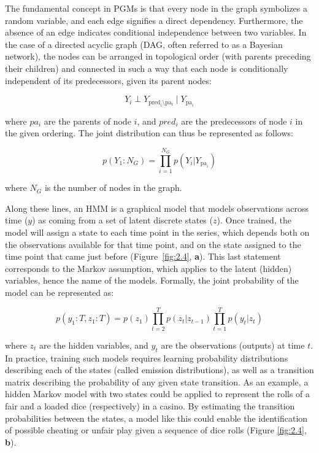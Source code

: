 The fundamental concept in PGMs is that every node in the graph symbolizes a random variable, and each edge signifies a direct dependency. Furthermore, the absence of an edge indicates conditional independence between two variables. In the case of a directed acyclic graph (DAG, often referred to as a Bayesian network), the nodes can be arranged in topological order (with parents preceding their children) and connected in such a way that each node is conditionally independent of its predecessors, given its parent nodes:

\begin{equation}
Y_i \perp Y_{\mathrm{pred}_i \setminus \mathrm{pa_i}} \mid Y_{\mathrm{pa}_i}
\label{eq:2.4}
\end{equation}

\noindent where $pa_i$ are the parents of node $i$, and $pred_i$ are the predecessors of node $i$ in the given ordering. The joint distribution can thus be represented as follows:

\begin{equation}
p(Y_1:N_G) = \prod_{i=1}^{N_G} p(Y_i | Y_{\mathrm{pa}_i})
\label{eq:2.5}
\end{equation}

\noindent where $N_G$ is the number of nodes in the graph.

Along these lines, an HMM is a graphical model that models observations across time ($y$) as coming from a set of latent discrete states ($z$). Once trained, the model will assign a state to each time point in the series, which depends both on the observations available for that time point, and on the state assigned to the time point that came just before (Figure~\ref{fig:2.4}, \textbf{a}). This last statement corresponds to the Markov assumption, which applies to the latent (hidden) variables, hence the name of the models. Formally, the joint probability of the model can be represented as:

\begin{equation}
p(y_1:T, z_1:T) = p(z_1) \prod_{t=2}^{T} p(z_t|z_{t-1}) \prod_{t=1}^{T} p(y_t|z_t)
\label{eq:2.6}
\end{equation}

\noindent where $z_t$ are the hidden variables, and $y_t$ are the observations (outputs) at time $t$. In practice, training such models requires learning probability distributions describing each of the states (called emission distributions), as well as a transition matrix describing the probability of any given state transition. As an example, a hidden Markov model with two states could be applied to represent the rolls of a fair and a loaded dice (respectively) in a casino. By estimating the transition probabilities between the states, a model like this could enable the identification of possible cheating or unfair play given a sequence of dice rolls \cite{Murphy2022ProbabilisticIntroduction} (Figure \ref{fig:2.4}, \textbf{b}).

